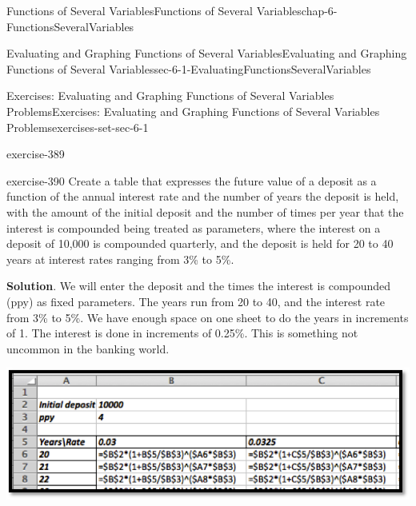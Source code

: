 \documentclass[oneside,10pt,]{book}
\numberwithin{equation}{section}
\begin{document}
\begin{chapterptx}{Functions of Several Variables}{}{Functions of Several Variables}{}{}{chap-6-FunctionsSeveralVariables}
\begin{sectionptx}{Evaluating and Graphing Functions of Several Variables}{}{Evaluating and Graphing Functions of Several Variables}{}{}{sec-6-1-EvaluatingFunctionsSeveralVariables}
\begin{exercises-subsection-numberless}{Exercises: Evaluating and Graphing Functions of Several Variables Problems}{}{Exercises: Evaluating and Graphing Functions of Several Variables Problems}{}{}{exercises-set-sec-6-1}
\begin{exercisegroup}
\begin{divisionexerciseeg}{12}{}{}{exercise-389}
\end{divisionexerciseeg}%
\begin{divisionexerciseeg}{13}{}{}{exercise-390}%
\hypertarget{p-2192}{}%
Create a table that expresses the future value of a deposit as a function of the annual interest rate and the number of years the deposit is held, with the amount of the initial deposit and the number of times per year that the interest is compounded being treated as parameters, where the interest on a deposit of \textdollar{}10,000 is compounded quarterly, and the deposit is held for 20 to 40 years at interest rates ranging from 3\% to 5\%.%
\par\smallskip%
\noindent\textbf{Solution}.\hypertarget{solution-196}{}\quad%
\hypertarget{p-2193}{}%
We will enter the deposit and the times the interest is compounded (ppy) as fixed parameters. The years run from 20 to 40, and the interest rate from 3\% to 5\%. We have enough space on one sheet to do the years in increments of 1. The interest is done in increments of 0.25\%. This is something not uncommon in the banking world.%
\begin{sidebyside}{1}{0.05}{0.05}{0}%
\begin{sbspanel}{0.9}%
\includegraphics[width=1\linewidth]{images/sec6-1-sol13a.png}
\end{sbspanel}%
\end{sidebyside}%
\begin{sidebyside}{1}{0}{0}{0}%
\begin{sbspanel}{1}%

\end{sbspanel}
\end{sidebyside}
\end{divisionexerciseeg}
\end{exercisegroup}
\end{exercises-subsection-numberless}
\end{sectionptx}
\end{chapterptx}
\end{document}
